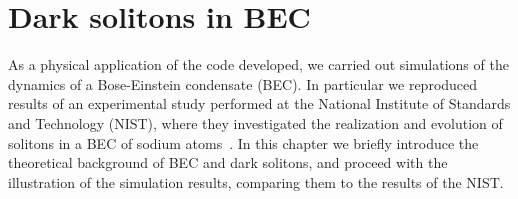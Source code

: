 \chapter{Dark solitons in BEC}
As a physical application of the code developed, we carried out simulations of the dynamics of a Bose-Einstein condensate (BEC). In particular we reproduced results of an experimental study performed at the National Institute of Standards and Technology (NIST), where they investigated the realization and evolution of solitons in a BEC of sodium atoms~\citep{DSF00}. In this chapter we briefly introduce the theoretical background of BEC and dark solitons, and proceed with the illustration of the simulation results, comparing them to the results of the NIST.

